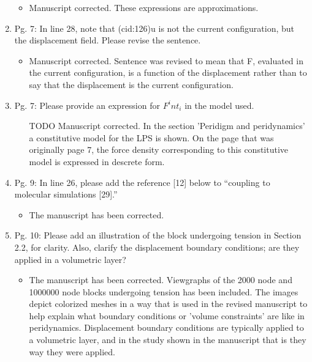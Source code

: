 \documentclass{article}
\begin{document}
\begin{enumerate}
{\color{red}  
\begin{itemize}
     \item
         Manuscript corrected. These expressions are approximations.
  \end{itemize}}

\item
Pg. 7: In line 28, note that (cid:126)u is not the current conﬁguration, but the displacement
ﬁeld. Please revise the sentence.

{\color{red}  
\begin{itemize}
    \item
        Manuscript corrected. Sentence was revised to mean that F, evaluated in the current configuration, is a function of the displacement rather than to say that the displacement is the current configuration.
        \end{itemize}}

\item
Pg. 7: Please provide an expression for ${F^int}_i$ in the model used.

{\color{red}  
\begin{itemize}
    \item
        [TODO]
        Manuscript corrected. In the section 'Peridigm and peridynamics' a constitutive model for the LPS is shown. On the page that was originally page 7, the force density corresponding to this constitutive model is expressed in descrete form.
  \end{itemize}}

\item
Pg. 9: In line 26, please add the reference [12] below to “coupling to molecular
simulations [29].”

{\color{red}  
\begin{itemize}
    \item
        The manuscript has been corrected.
  \end{itemize}}

\item
Pg. 10: Please add an illustration of the block undergoing tension in Section 2.2,
for clarity. Also, clarify the displacement boundary conditions; are they applied in a
volumetric layer?

{\color{red}  
\begin{itemize}
    \item
        The manuscript has been corrected. Viewgraphs of the 2000 node and 1000000 node blocks undergoing tension has been included. The images depict colorized meshes in a way that is used in the revised manuscript to help explain what boundary conditions or 'volume constraints' are like in peridynamics. Displacement boundary conditions are typically applied to a volumetric layer, and in the study shown in the manuscript that is they way they were applied.
  \end{itemize}}


\end{enumerate}
\end{document}
